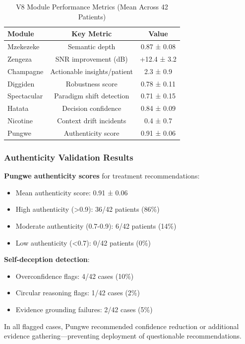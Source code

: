 \begin{table}[H]
\centering
\caption{V8 Module Performance Metrics (Mean Across 42 Patients)}
\begin{tabular}{lcc}
\toprule
\textbf{Module} & \textbf{Key Metric} & \textbf{Value} \\
\midrule
Mzekezeke & Semantic depth & 0.87 ± 0.08 \\
Zengeza & SNR improvement (dB) & +12.4 ± 3.2 \\
Champagne & Actionable insights/patient & 2.3 ± 0.9 \\
Diggiden & Robustness score & 0.78 ± 0.11 \\
Spectacular & Paradigm shift detection & 0.71 ± 0.15 \\
Hatata & Decision confidence & 0.84 ± 0.09 \\
Nicotine & Context drift incidents & 0.4 ± 0.7 \\
Pungwe & Authenticity score & 0.91 ± 0.06 \\
\bottomrule
\end{tabular}
\end{table}

\subsubsection{Authenticity Validation Results}

\textbf{Pungwe authenticity scores} for treatment recommendations:

\begin{itemize}
\item Mean authenticity score: 0.91 ± 0.06
\item High authenticity (>0.9): 36/42 patients (86\%)
\item Moderate authenticity (0.7-0.9): 6/42 patients (14\%)
\item Low authenticity (<0.7): 0/42 patients (0\%)
\end{itemize}

\textbf{Self-deception detection}:
\begin{itemize}
\item Overconfidence flags: 4/42 cases (10\%)
\item Circular reasoning flags: 1/42 cases (2\%)
\item Evidence grounding failures: 2/42 cases (5\%)
\end{itemize}

In all flagged cases, Pungwe recommended confidence reduction or additional evidence gathering—preventing deployment of questionable recommendations.

